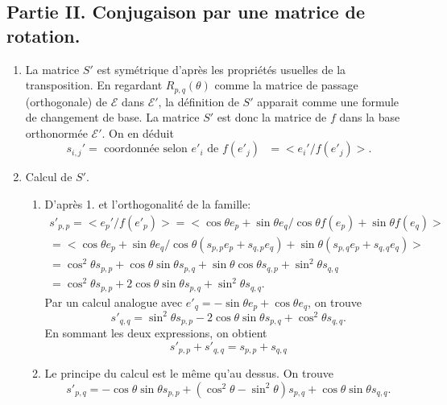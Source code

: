 \subsection*{Partie II. Conjugaison par une matrice de rotation.}
\begin{enumerate}
 \item La matrice $S'$ est symétrique d'après les propriétés usuelles de la transposition.\newline
En regardant $R_{p,q}(\theta)$ comme la matrice de passage (orthogonale) de $\mathcal{E}$ dans $\mathcal{E}'$, la définition de $S'$ apparait comme une formule de changement de base. La matrice $S'$ est donc la matrice de $f$ dans la base orthonormée $\mathcal{E}'$. On en déduit
\begin{displaymath}
 s_{i,j}' = \text{ coordonnée selon $e'_i$ de $f(e'_j)$ } = <e_i' / f(e'_j)>.
\end{displaymath}


 \item Calcul de $S'$.\label{formules}
\begin{enumerate}
 \item D'après 1. et l'orthogonalité de la famille:
\begin{multline*}
 s'_{p,p} = <e_p' / f(e'_p)>
 = <\cos \theta e_p + \sin \theta e_q / \cos \theta f(e_p) + \sin \theta f(e_q)>\\
 = <\cos \theta e_p + \sin \theta e_q / \cos \theta \left( s_{p,p}e_p+s_{q,p}e_q\right)  + \sin \theta \left( s_{p,q}e_p+s_{q,q}e_q\right) >\\
 = \cos^2\theta s_{p,p} + \cos\theta \sin\theta s_{p,q} 
  +\sin \theta \cos \theta s_{q,p} + \sin^2\theta s_{q,q} \\
 = \cos^2\theta s_{p,p} + 2 \cos\theta \sin\theta s_{p,q} + \sin^2\theta s_{q,q}.
\end{multline*}
Par un calcul analogue avec $e'_q = -\sin \theta e_p + \cos \theta e_q$, on trouve
\begin{displaymath}
 s'_{q,q} = \sin^2\theta s_{p,p} - 2 \cos\theta \sin\theta s_{p,q} + \cos^2\theta s_{q,q}. 
\end{displaymath}
En sommant les deux expressions, on obtient
\begin{displaymath}
 s'_{p,p} + s'_{q,q} = s_{p,p} + s_{q,q}
\end{displaymath}

 \item Le principe du calcul est le même qu'au dessus. On trouve
\begin{displaymath}
 s'_{p,q} = -\cos \theta \sin \theta s_{p,p} + \left( \cos^2 \theta - \sin^2 \theta\right)s_{p,q} + \cos\theta\sin \theta s_{q,q}. 
\end{displaymath}


\end{enumerate}
\end{enumerate}
